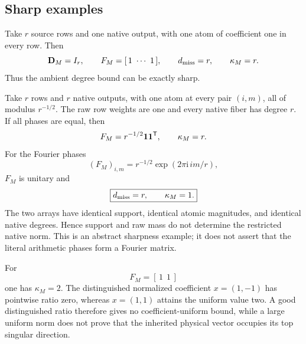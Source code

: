 \subsection{Sharp examples}

\begin{example}
\label{ex:tpc61-coherent-incidence}
Take \(r\) source rows and one native output, with one atom of coefficient
one in every row.  Then
\begin{equation}
 \mathbf D_M=I_r,
 \qquad
 F_M=[\,1\ \cdots\ 1\,],
 \qquad
 d_{\rm miss}=r,
 \qquad
 \kappa_M=r.
 \label{eq:tpc61-coherent-example}
\end{equation}
Thus the ambient degree bound can be exactly sharp.
\end{example}

\begin{example}
\label{ex:tpc61-fourier-incidence}
Take \(r\) rows and \(r\) native outputs, with one atom at every pair
\((i,m)\), all of modulus \(r^{-1/2}\).  The raw row weights are one and
every native fiber has degree \(r\).  If all phases are equal, then
\[
 F_M=r^{-1/2}\mathbf 1\mathbf 1^{\mathsf T},
 \qquad
 \kappa_M=r.
\]
For the Fourier phases
\begin{equation}
 (F_M)_{i,m}
 =r^{-1/2}\exp(2\pi\mathrm i\,im/r),
 \label{eq:tpc61-fourier-matrix}
\end{equation}
\(F_M\) is unitary and
\begin{equation}
 \boxed{d_{\rm miss}=r,\qquad\kappa_M=1.}
 \label{eq:tpc61-fourier-saving}
\end{equation}
The two arrays have identical support, identical atomic magnitudes, and
identical native degrees.  Hence support and raw mass do not determine the
restricted native norm.  This is an abstract sharpness example; it does
not assert that the literal arithmetic phases form a Fourier matrix.
\end{example}

\begin{example}
\label{ex:tpc61-uniform-distinguished}
For
\[
 F_M=[\,1\ \ 1\,]
\]
one has \(\kappa_M=2\).  The distinguished normalized coefficient
\(x=(1,-1)\) has pointwise ratio zero, whereas \(x=(1,1)\) attains the
uniform value two.  A good distinguished ratio therefore gives no
coefficient-uniform bound, while a large uniform norm does not prove that
the inherited physical vector occupies its top singular direction.
\end{example}

